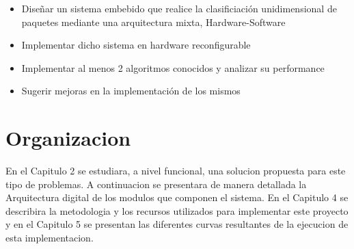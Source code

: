     \begin{itemize}     

     	\item Diseñar un sistema embebido que realice la clasificiación unidimensional de paquetes mediante una arquitectura mixta, Hardware-Software
	\item Implementar dicho sistema en hardware reconfigurable
	\item Implementar al menos 2 algoritmos conocidos y analizar su performance
	\item Sugerir mejoras en la implementación de los mismos   

\end{itemize}


\section{Organizacion}

En el Capitulo 2 se estudiara, a nivel funcional, una solucion propuesta para este tipo de problemas. A continuacion se presentara de manera detallada la Arquitectura digital de los modulos que componen el sistema. En el Capitulo 4 se describira la metodologia y los recursos utilizados para implementar este proyecto y en el Capitulo 5 se presentan las diferentes curvas resultantes de la ejecucion de esta implementacion.






